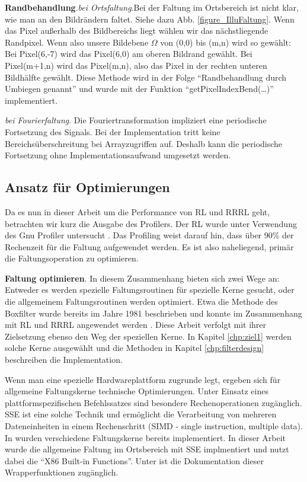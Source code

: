 \documentclass[a4paper,12pt]{article}
\begin{document}
\textbf{Randbehandlung}.\emph{bei Ortsfaltung}.Bei der Faltung im Ortsbereich
ist nicht klar, wie man an den Bildrändern faltet. Siehe dazu Abb. \ref{figure_IlluFaltung}.
Wenn das Pixel außerhalb des Bildbereichs liegt wählen wir das nächstliegende
Randpixel. Wenn also unsere Bildebene $\Omega$ von (0,0) bis (m,n) wird so
gewählt: Bei Pixel(6,-7) wird das Pixel(6,0) am oberen Bildrand gewählt. Bei
Pixel(m+1,n) wird das Pixel(m,n), also das Pixel in der rechten unteren
Bildhälfte gewählt. Diese Methode wird in der Folge "`Randbehandlung durch
Umbiegen genannt"' und wurde mit der Funktion "`getPixelIndexBend(\ldots)"'
implementiert.

\emph{bei Fourierfaltung}. Die Fouriertransformation impliziert eine periodische
Fortsetzung des Signals. Bei der Implementation tritt
keine Bereichsüberschreitung bei Arrayzugriffen auf. Deshalb kann die
periodische Fortsetzung ohne Implementationsaufwand umgesetzt werden.

\subsection{Ansatz für Optimierungen}
Da es nun in dieser Arbeit um die Performance von RL und RRRL geht, betrachten
wir kurz die Ausgabe des Profilers. Der RL wurde unter Verwendung des Gnu
Profiler untersucht \cite{gprof}. Das Profiling weist darauf hin, dass über 90\%
der Rechenzeit für die Faltung aufgewendet werden. Es ist also naheliegend,
primär die Faltungsoperation zu optimieren. 

\textbf{Faltung optimieren}.
In diesem Zusammenhang bieten sich
zwei Wege an: Entweder es werden spezielle Faltungsroutinen für spezielle
Kerne gesucht, oder die allgemeinem Faltungsroutinen werden optimiert. 
Etwa die Methode des Boxfilter wurde bereits im Jahre 1981 beschrieben
\cite{mcdonnell} und konnte im Zusammenhang mit RL und RRRL angewendet werden \cite{vimpaper}. 
Diese Arbeit verfolgt mit ihrer Zielsetzung ebenso den Weg der
speziellen Kerne. In Kapitel \ref{chp:ziel1} werden solche Kerne ausgewählt und
die Methoden in Kapitel \ref{chp:filterdesign} beschreiben die Implementation. 

Wenn man eine spezielle Hardwareplattform zugrunde legt, ergeben sich für
allgemeine Faltungskerne technische Optimierungen. Unter Einsatz eines
plattformspezifischen Befehlssatzes sind besondere Rechenoperationen zugänglich.
SSE ist eine solche Technik und ermöglicht die Verarbeitung von mehreren
Dateneinheiten in einem Rechenschritt (SIMD - single instruction, multiple
data). In \cite{sse} wurden verschiedene Faltungskerne bereits implementiert. In
dieser Arbeit wurde die allgemeine Faltung im Ortsbereich mit SSE implmentiert
und nutzt dabei die "`X86 Built-in Functions"'. Unter \cite{gcc} ist die
Dokumentation dieser Wrapperfunktionen zugänglich.
\end{document}
